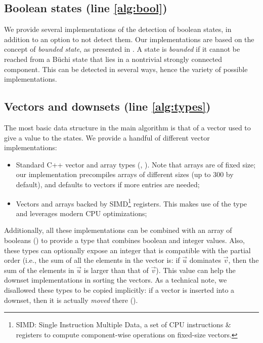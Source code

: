 \documentclass[runningheads,a4paper,draft]{llncs}
\begin{document}
\subsection{Boolean states (line \ref{alg:bool})}\label{sec:implem-bool}

We provide several implementations of the detection of boolean states, in
addition to an option to not detect them.  Our implementations are based on the
concept of \emph{bounded state}, as presented in \cite{bohy14}.  A state is
\emph{bounded} if it cannot be reached from a Büchi state that lies in a
nontrivial strongly connected component.  This 
can be detected in
several ways, hence the variety of possible implementations.

\subsection{Vectors and downsets (line \ref{alg:types})}

The most basic data structure in the main algorithm is that of a vector used to
give a value to the states.  We provide a handful of different vector
implementations:
\begin{itemize}
\item Standard C++ vector and array types (,\linebreak
  ).  Note that arrays are of fixed size; our implementation
  precompiles arrays of different sizes (up to \(300\) by default),
  and defaults to vectors if more entries are needed;
\item Vectors and arrays backed by SIMD\footnote{SIMD: Single Instruction
  Multiple Data, a set of CPU instructions \& registers to compute
  component-wise operations on fixed-size vectors.} registers.  This makes use of the
  type  and leverages modern CPU optimizations;
\end{itemize}

Additionally, all these implementations can be combined with an array of booleans
() to provide a type that combines boolean and integer
values.  Also, these types can optionally expose an integer that is compatible
with the partial order (i.e., the sum of all the elements in the vector
is: if \(\vec{u}\) dominates \(\vec{v}\), then the sum of the elements in \(\vec{u}\)
is larger than that of \(\vec{v}\)).  This value can help the downset
implementations in sorting the vectors.  As a technical note, we disallowed
these types to be copied implicitly: if a vector is inserted into a downset,
then it is actually \emph{moved} there ().
\end{document}
